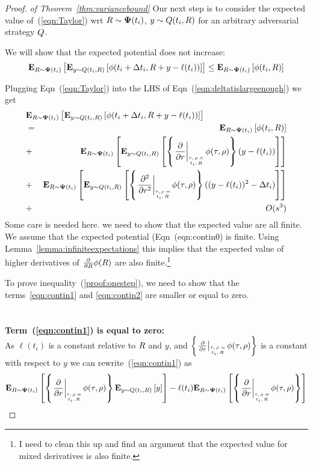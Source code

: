 \documentclass[anon,12pt]{colt2024} %
\begin{document}
\begin{proof} {\em of Theorem~\ref{thm:variancebound}}
Our next step is to consider the expected value of~(\ref{eqn:Taylor}) wrt $R \sim {\bf \Psi}(t_i)$,
$y \sim Q(t_i,R)$ for an arbitrary adversarial strategy
$Q$.

We will show that the expected potential does not increase:
\begin{equation} \label{eqn:deltatislargeenough}
     {\bf E}_{R \sim {\bf \Psi}(t_i)}\left[  {\bf E}_{y \sim Q(t_i,R)}\left[ \phi(t_i+\Delta t_i,R+y-\ell(t_i)) \right] \right] \leq {\bf E}_{R \sim {\bf \Psi}(t_i)}\left[ \phi(t_i,R) \right]
\end{equation}

Plugging Eqn~(\ref{eqn:Taylor}) into the LHS of
Eqn~(\ref{eqn:deltatislargeenough}) we get
\begin{eqnarray}
  \lefteqn{\E{\R \sim \state(t_i)}{\E{y \sim \adversM(t_i,\R)}{\pot(t_i+\deltat_i,\R+y-\ell(t_i))}}} \\
  &=& \E{\R \sim \state(t_i)}{\pot(t_i,\R)} \label{eqn:contin0}\\
  &+& \E{\R \sim \state(t_i)}{\E{y \sim \adversM(t_i,\R)}{\at{\frac{\partial}{\partial r}} (y-\ell(t_i))}} \label{eqn:contin1}\\
  &+& \E{\R \sim \state(t_i)}{\E{y \sim
      \adversM(t_i,\R)}{\at{\frac{\partial^2}{\partial r^2}}
      ((y-\ell(t_i))^2 - \deltat_i)}}
  \label{eqn:contin2}\\
  &+& O(s^3) \label{eqn:contin3}
\end{eqnarray}
Some care is needed here. we need to show that the expected value
are all finite. We assume that the expected potential
(Eqn~({eqn:contin0}) is finite. Using
Lemma~\ref{lemma:infiniteexpectations} this implies that the expected
value of higher derivatives of $\frac{\partial}{\partial R} \phi(R)$
are also finite.\footnote{I need to clean this up and find an argument
  that the expected value for mixed derivatives is also finite.}


To prove inequality~(\ref{proof:onestep}), we need to show that the
terms~\ref{eqn:contin1} and \ref{eqn:contin2} are smaller or equal to
zero.
~\\~\\~\\
{\bf Term~(\ref{eqn:contin1}) is equal to zero:}\\
As $\ell(t_i)$ is a constant
relative to $R$ and $y$, and $\at{\frac{\partial}{\partial r}}$ is a
constant with respect to $y$ we can rewrite~(\ref{eqn:contin1}) as
\begin{equation} \label{eqnterm1.1}
  \E{\R \sim \state(t_i)}{\at{\frac{\partial}{\partial r}}
    \E{y \sim \adversM(t_i,\R)}{y} }
- \ell(t_i) \E{\R \sim \state(t_i)}{\at{\frac{\partial}{\partial r}}}
\end{equation}


\end{proof}
\end{document}
